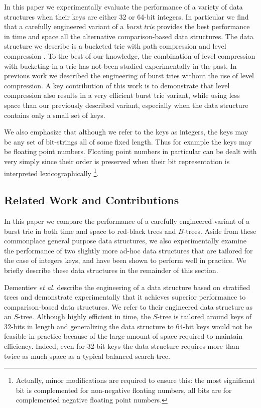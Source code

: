 \documentclass[]{acmtrans2m}
\begin{document}
In this paper we experimentally evaluate the performance of a variety of data structures when
their keys are either 32 or 64-bit integers. In particular we find that a carefully engineered
variant of a \textit{burst trie} \cite{Heinz+02} provides the best performance in time and
space all the alternative comparison-based data structures. The data structure we
describe is a bucketed trie with path compression and level compression \cite{AnderssonNilsson93}. 
To the best of our knowledge, the combination of level compression with bucketing in a trie has not
been studied experimentally in the past. In previous work \cite{NashGregg08} we described the
engineering of burst tries without the use of level compression. A key contribution of this work
is to demonstrate that level compression also results in a very efficient burst trie variant, while
using less space than our previously described variant, especially when the data structure contains
only a small set of keys.

We also emphasize that although we refer to the keys as integers, 
the keys may be any set of bit-strings all of some fixed length. Thus for example the keys
may be floating point numbers. Floating point numbers in particular can be dealt with very simply since their order
is preserved when their bit representation is interpreted lexicographically \cite{IEEE-754-2008}\footnote{Actually,
minor modifications are required to ensure this: the most significant bit is complemented for non-negative
floating numbers, all bits are for complemented negative floating point numbers.}.

\subsection{Related Work and Contributions}
\label{related_work}

In this paper we compare the performance of a carefully engineered variant of a burst trie in both time and space to
red-black trees and $B$-trees. Aside from these commonplace general purpose data structures, we also
experimentally examine the performance of two slightly more ad-hoc data structures \cite{Dementiev+04,KordaRaman99} 
that are tailored for the case of integers keys, and have been shown to perform well in practice. We briefly describe these
data structures in the remainder of this section.

Dementiev \textit{et al.} \citeyear{Dementiev+04} describe the engineering of a data structure based
on stratified trees \cite{vanEmdeBoas77} and demonstrate experimentally that it achieves superior performance to comparison-based data structures. 
We refer to their engineered data structure as an $S$-tree.
Although highly efficient in time, the $S$-tree is tailored around keys of 32-bits in length
and generalizing the data structure to 64-bit keys would not be feasible in practice because of
the large amount of space required to maintain efficiency. Indeed, even for 32-bit keys the data structure
requires more than twice as much space as a typical balanced search tree.
\end{document}
